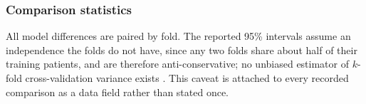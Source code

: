 \subsubsection{Comparison statistics}

All model differences are paired by fold. The reported 95\% intervals assume an independence the folds do not have, since any two folds share about half of their training patients, and are therefore anti-conservative; no unbiased estimator of $k$-fold cross-validation variance exists \cite{bengio2004}. This caveat is attached to every recorded comparison as a data field rather than stated once.
